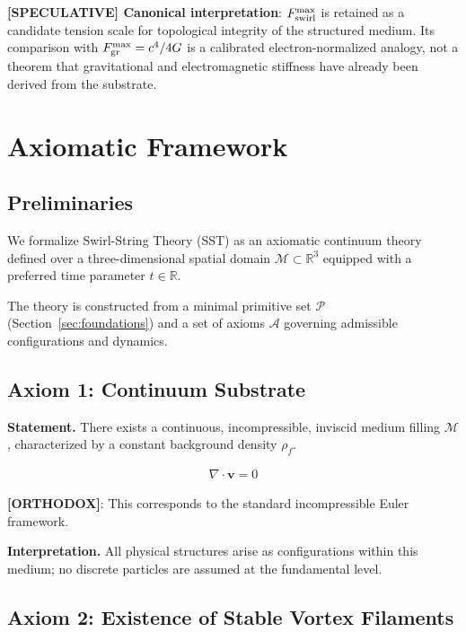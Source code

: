 \documentclass[11pt]{article}
\theoremstyle{definition}
\theoremstyle{plain}
\theoremstyle{remark}
\newcommand{\rhoF}{{\rho_{\!f}}}
\begin{document}
        \textbf{[SPECULATIVE] Canonical interpretation}: $F_{\rm swirl}^{\max}$ is retained as a candidate tension scale for topological integrity of the structured medium. Its comparison with $F_{\rm gr}^{\max}=c^4/4G$ is a calibrated electron-normalized analogy, not a theorem that gravitational and electromagnetic stiffness have already been derived from the substrate.

\section{Axiomatic Framework}
    \label{sec:axioms}
    
    \subsection{Preliminaries}
        
        We formalize Swirl-String Theory (SST) as an axiomatic continuum theory defined over a three-dimensional spatial domain $\mathcal{M} \subset \mathbb{R}^3$ equipped with a preferred time parameter $t \in \mathbb{R}$.
        
        The theory is constructed from a minimal primitive set $\mathcal{P}$ (Section~\ref{sec:foundations}) and a set of axioms $\mathcal{A}$ governing admissible configurations and dynamics.
    
    \subsection{Axiom 1: Continuum Substrate}
        
        \textbf{Statement.}
        There exists a continuous, incompressible, inviscid medium filling $\mathcal{M}$, characterized by a constant background density $\rhoF$.
        
        \begin{align}
            \nabla \cdot \mathbf{v} = 0
        \end{align}
        
        \textbf{[ORTHODOX]}: This corresponds to the standard incompressible Euler framework.
        
        \textbf{Interpretation.}
        All physical structures arise as configurations within this medium; no discrete particles are assumed at the fundamental level.
    
    \subsection{Axiom 2: Existence of Stable Vortex Filaments}
        
\end{document}
